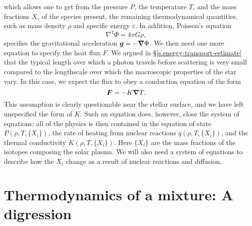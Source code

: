  which allows one to get from the pressure $P$, the temperature $T$, and the mass fractions $X_{i}$ of the species present, the remaining thermodynamical quantities, such as mass density $\rho$ and specific energy $\varepsilon$. In addition, Poisson's equation
\begin{equation}\label{e.poisson}
\nabla^{2}\Phi = 4\pi G\rho,
\end{equation}
specifies the gravitational acceleration $\boldsymbol{g} = -\boldsymbol{\nabla}\Phi$. We then need one more equation to specify the heat flux $F$. We argued in \S\ref{s.energy-transport-estimate} that the typical length over which a photon travels before scattering is very small compared to the lengthscale over which the macroscopic properties of the star vary.  In this case, we expect the flux to obey a conduction equation of the form
\begin{equation}\label{e.conduction-simple}
\boldsymbol{F} = -K\boldsymbol{\nabla} T.
\end{equation}
This assumption is clearly questionable near the stellar surface, and we have left unspecified the form of $K$.  Such an equation does, however, close the system of equations; all of the physics is then contained in the equation of state $P(\rho,T,\{X_{i}\})$, the rate of heating from nuclear reactions $q(\rho, T, \{X_{i}\})$, and the thermal conductivity $K(\rho,T,\{X_{i}\})$. Here $\{X_{i}\}$ are the mass fractions of the isotopes composing the solar plasma. We will also need a system of equations to describe how the $X_{i}$ change as a result of nuclear reactions and diffusion.

\section[Thermodynamics of a Mixture]{Thermodynamics of a mixture: A digression}\label{s.composition}
